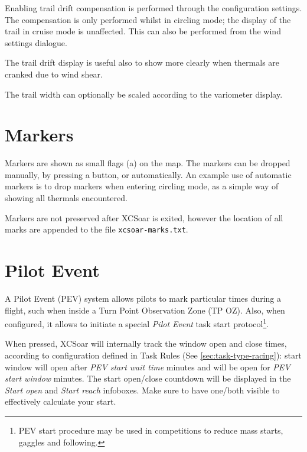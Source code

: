 Enabling trail drift compensation is performed through the
configuration settings.  The compensation is only performed
whilst in circling mode; the display of the trail in cruise mode is unaffected.
This can also be performed from the wind settings dialogue.

The trail drift display is useful also to show more clearly when thermals
are cranked due to wind shear.

The trail width can optionally be scaled according to the variometer display.


\section{Markers}\label{sec:markers}

Markers are shown as small flags (a) on the map.  The markers can be dropped
manually, by pressing a button, or automatically.  An example use of
automatic markers is to drop markers when entering circling mode, as a
simple way of showing all thermals encountered.

Markers are not preserved after XCSoar is exited, however the location
of all marks are appended to the file \verb|xcsoar-marks.txt|.

\section{Pilot Event}\label{sec:pilotevent}

A Pilot Event (PEV) system allows pilots to mark particular times during a
flight, such when inside a Turn Point Observation Zone (TP OZ). Also, when
configured, it allows to initiate a special \emph{Pilot Event} task start
protocol\footnote{PEV start procedure may be used in competitions to reduce
mass starts, gaggles and following.}.


When pressed, XCSoar will internally track the window open and close times, according 
to configuration defined in Task Rules (See \ref{sec:task-type-racing}): start
window will open after \emph{PEV start wait time}  minutes
and will be open for \emph{PEV start window} minutes. The start open/close
countdown will be displayed in the \emph{Start open} and \emph{Start reach} 
infoboxes. Make sure to have one/both visible to effectively calculate your start.

